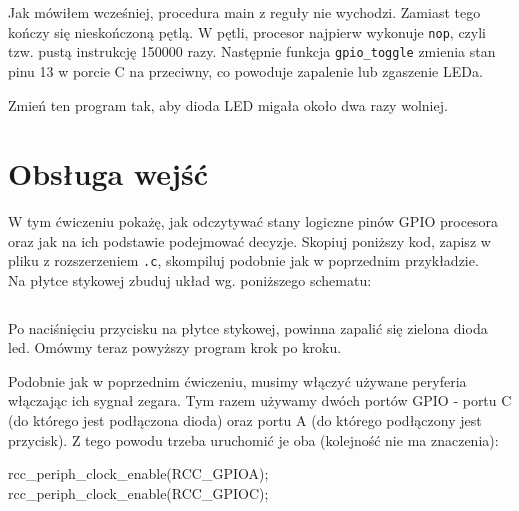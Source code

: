 \documentclass{pdfBooklets}
\begin{document}
Jak mówiłem wcześniej, procedura main z reguły nie wychodzi. Zamiast tego kończy się nieskończoną pętlą. W pętli, procesor najpierw
wykonuje \texttt{nop}, czyli tzw. pustą instrukcję 150000 razy\footnotemark. Następnie funkcja \Verb$gpio_toggle$ zmienia stan pinu 13
w porcie C na przeciwny, co powoduje zapalenie lub zgaszenie LEDa.

\begin{Zadanie}{}{}
  Zmień ten program tak, aby dioda LED migała około dwa razy wolniej.
\end{Zadanie}



\section{Obsługa wejść}
W tym ćwiczeniu pokażę, jak odczytywać stany logiczne pinów GPIO procesora oraz jak na ich podstawie podejmować
decyzje. Skopiuj poniższy kod, zapisz w pliku z rozszerzeniem \Verb$.c$, skompiluj podobnie jak w poprzednim przykładzie.
\\

Na płytce stykowej zbuduj układ wg. poniższego schematu:


\inputminted[frame=single,firstline=11]{c}{stm32-examples/01_di/main.c}

Po naciśnięciu przycisku na płytce stykowej, powinna zapalić się zielona dioda led. Omówmy teraz powyższy program krok po kroku.

Podobnie jak w poprzednim ćwiczeniu, musimy włączyć używane peryferia włączając ich sygnał zegara. Tym razem używamy
dwóch portów GPIO - portu C (do którego jest podłączona dioda) oraz portu A (do którego podłączony jest przycisk).
Z tego powodu trzeba uruchomić je oba (kolejność nie ma znaczenia):

\begin{CodeFrame*}[c]{}
  rcc_periph_clock_enable(RCC_GPIOA);
  rcc_periph_clock_enable(RCC_GPIOC);
\end{CodeFrame*}
\end{document}
